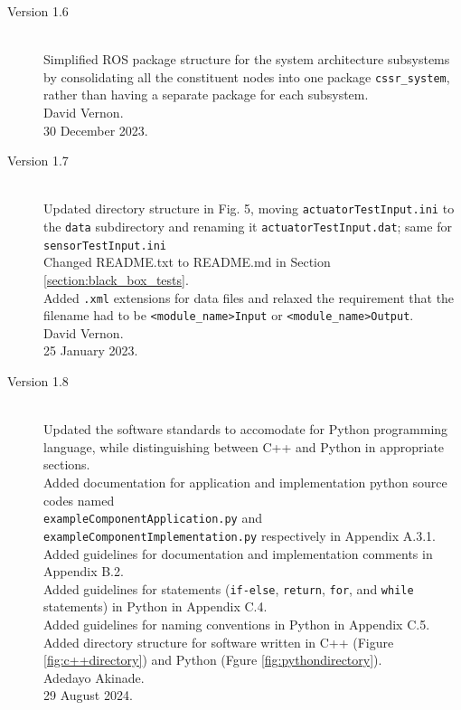 \documentclass{CSSRforAfrica}
\begin{document}
\begin{description}
\item [Version 1.6]~\\
Simplified ROS package structure for the system architecture subsystems by consolidating all the constituent nodes into one package {\small \verb+cssr_system+}, rather than having a separate package for each subsystem.\\
David Vernon. \\                               
30 December 2023.   

\newpage
\item [Version 1.7]~\\
Updated directory structure in Fig. 5, moving {\small \verb+actuatorTestInput.ini+} to  the {\small \verb+data+} subdirectory and renaming it  {\small\verb+actuatorTestInput.dat+}; same for {\small \verb+sensorTestInput.ini+} \\
Changed README.txt to README.md in Section \ref{section:black_box_tests}.\\
Added  {\small \verb+.xml+}  extensions for data files and relaxed the requirement that the filename had to be {\small \verb+<module_name>Input+} or {\small \verb+<module_name>Output+}. \\
David Vernon. \\                               
25 January 2023. 

 
\item [Version 1.8]~\\
Updated the software standards to accomodate for Python programming language, while distinguishing between C++ and Python in appropriate sections.  \\
Added documentation for application and implementation python source codes named \\
{\small \verb+exampleComponentApplication.py+} and {\small \verb+exampleComponentImplementation.py+} respectively in Appendix A.3.1. \\
Added guidelines for documentation and implementation comments in Appendix B.2. \\
Added guidelines for statements (\verb+if-else+, \verb+return+, \verb+for+, and \verb+while+ statements) in Python in Appendix C.4.\\
Added guidelines for naming conventions in Python in Appendix C.5. \\
Added directory structure for software written in C++ (Figure \ref{fig:c++directory}) and Python (Fgure \ref{fig:pythondirectory}). \\
Adedayo Akinade. \\
29 August 2024. 



\end{description}
\end{document}

